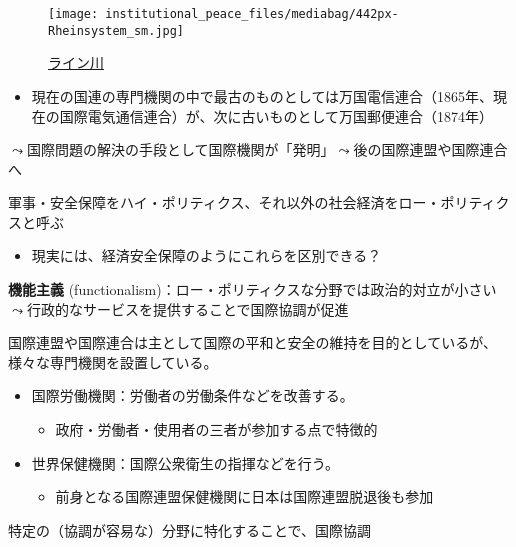 \documentclass[
  xelatex,
  ja=standard]{bxjsarticle}
\providecommand{\tightlist}{%
  \setlength{\itemsep}{0pt}\setlength{\parskip}{0pt}}\usepackage{longtable,booktabs,array}
\begin{document}
\begin{figure}[htpb]

{\centering \texttt{[image: institutional\_peace\_files/mediabag/442px-Rheinsystem\_sm.jpg]}

}

\caption{\href{https://commons.wikimedia.org/wiki/File:Rheinsystem_small_internat.jpg}{ライン川}}

\end{figure}

\begin{itemize}
\tightlist
\item
  現在の国連の専門機関の中で最古のものとしては万国電信連合（1865年、現在の国際電気通信連合）が、次に古いものとして万国郵便連合（1874年）
\end{itemize}

\(\leadsto\)国際問題の解決の手段として国際機関が「発明」\(\leadsto\)後の国際連盟や国際連合へ

軍事・安全保障をハイ・ポリティクス、それ以外の社会経済をロー・ポリティクスと呼ぶ

\begin{itemize}
\tightlist
\item
  現実には、経済安全保障のようにこれらを区別できる？
\end{itemize}

\textbf{機能主義}
(functionalism)：ロー・ポリティクスな分野では政治的対立が小さい\(\leadsto\)行政的なサービスを提供することで国際協調が促進

国際連盟や国際連合は主として国際の平和と安全の維持を目的としているが、様々な専門機関を設置している。

\begin{itemize}
\tightlist
\item
  国際労働機関：労働者の労働条件などを改善する。

  \begin{itemize}
  \tightlist
  \item
    政府・労働者・使用者の三者が参加する点で特徴的
  \end{itemize}
\item
  世界保健機関：国際公衆衛生の指揮などを行う。

  \begin{itemize}
  \tightlist
  \item
    前身となる国際連盟保健機関に日本は国際連盟脱退後も参加
  \end{itemize}
\end{itemize}

特定の（協調が容易な）分野に特化することで、国際協調
\end{document}

